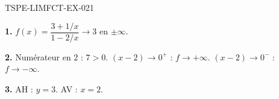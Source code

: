 \begin{corrige}{TSPE-LIMFCT-EX-021}

\textbf{1.} $f(x) = \dfrac{3+1/x}{1-2/x} \to \boxed{3}$ en $\pm\infty$.

\textbf{2.} Numérateur en $2$ : $7 > 0$. $(x-2) \to 0^+$ : $f \to \boxed{+\infty}$. $(x-2) \to 0^-$ : $f \to \boxed{-\infty}$.

\textbf{3.} AH : $y = 3$. AV : $x = 2$.

\end{corrige}
